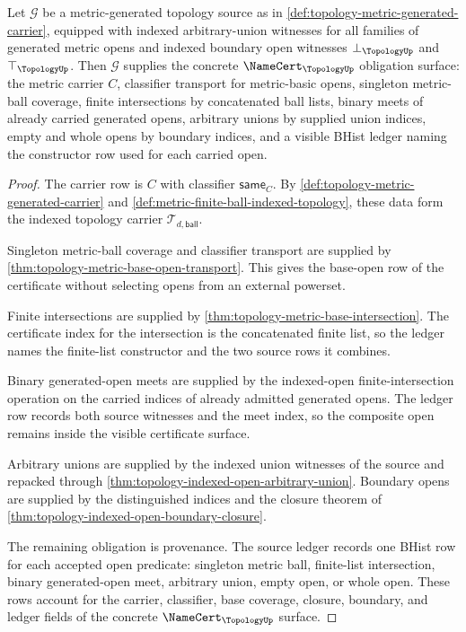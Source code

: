 \begin{theorem}
\label{thm:topology-metric-generated-namecert-surface}
Let $\mathcal{G}$ be a metric-generated topology source as in \autoref{def:topology-metric-generated-carrier}, equipped with indexed arbitrary-union witnesses for all families of generated metric opens and indexed boundary open witnesses $\bot_{\TopologyUp}$ and $\top_{\TopologyUp}$. Then $\mathcal{G}$ supplies the concrete $\NameCert_{\TopologyUp}$ obligation surface: the metric carrier $C$, classifier transport for metric-basic opens, singleton metric-ball coverage, finite intersections by concatenated ball lists, binary meets of already carried generated opens, arbitrary unions by supplied union indices, empty and whole opens by boundary indices, and a visible BHist ledger naming the constructor row used for each carried open.
\end{theorem}
\begin{proof}
The carrier row is $C$ with classifier $\mathsf{same}_C$. By \autoref{def:topology-metric-generated-carrier} and \autoref{def:metric-finite-ball-indexed-topology}, these data form the indexed topology carrier $\mathcal{T}_{d,\mathsf{ball}}$.

Singleton metric-ball coverage and classifier transport are supplied by \autoref{thm:topology-metric-base-open-transport}. This gives the base-open row of the certificate without selecting opens from an external powerset.

Finite intersections are supplied by \autoref{thm:topology-metric-base-intersection}. The certificate index for the intersection is the concatenated finite list, so the ledger names the finite-list constructor and the two source rows it combines.

Binary generated-open meets are supplied by the indexed-open finite-intersection operation on the carried indices of already admitted generated opens. The ledger row records both source witnesses and the meet index, so the composite open remains inside the visible certificate surface.

Arbitrary unions are supplied by the indexed union witnesses of the source and repacked through \autoref{thm:topology-indexed-open-arbitrary-union}. Boundary opens are supplied by the distinguished indices and the closure theorem of \autoref{thm:topology-indexed-open-boundary-closure}.

The remaining obligation is provenance. The source ledger records one BHist row for each accepted open predicate: singleton metric ball, finite-list intersection, binary generated-open meet, arbitrary union, empty open, or whole open. These rows account for the carrier, classifier, base coverage, closure, boundary, and ledger fields of the concrete $\NameCert_{\TopologyUp}$ surface.
\end{proof}


